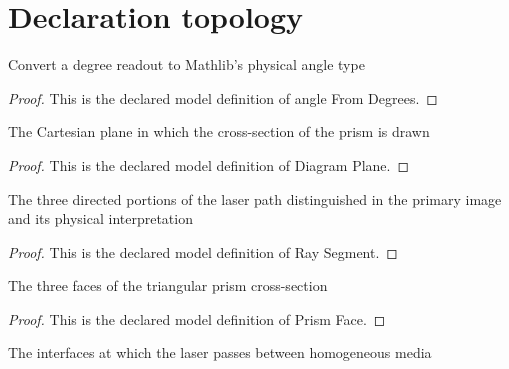 \section{Declaration topology}
\begin{definition}
  \label{def:physics:phyx-mini-0006:phyxminiproblems-problemphyxmini0006-anglefromdegrees}
  Convert a degree readout to Mathlib's physical angle type
\end{definition}
\begin{proof}
  This is the declared model definition of angle From Degrees.
\end{proof}
\begin{definition}
  \label{def:physics:phyx-mini-0006:phyxminiproblems-problemphyxmini0006-diagramplane}
  The Cartesian plane in which the cross-section of the prism is drawn
\end{definition}
\begin{proof}
  This is the declared model definition of Diagram Plane.
\end{proof}
\begin{definition}
  \label{def:physics:phyx-mini-0006:phyxminiproblems-problemphyxmini0006-raysegment}
  The three directed portions of the laser path distinguished in the primary image and its physical interpretation
\end{definition}
\begin{proof}
  This is the declared model definition of Ray Segment.
\end{proof}
\begin{definition}
  \label{def:physics:phyx-mini-0006:phyxminiproblems-problemphyxmini0006-prismface}
  The three faces of the triangular prism cross-section
\end{definition}
\begin{proof}
  This is the declared model definition of Prism Face.
\end{proof}
\begin{definition}
  \label{def:physics:phyx-mini-0006:phyxminiproblems-problemphyxmini0006-refractinginterface}
  The interfaces at which the laser passes between homogeneous media
\end{definition}
